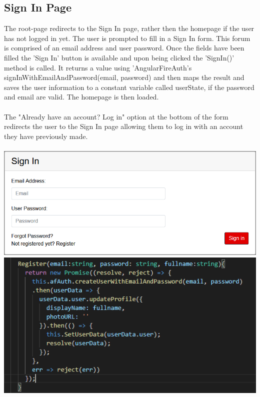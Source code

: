 \subsection{Sign In Page}
The root-page redirects to the Sign In page, rather then the homepage if the user has not logged in yet. The user is prompted to fill  in a Sign In form. This forum is comprised of an email address and user password. Once the fields have been filled the 'Sign In' button is available and upon being clicked the 'SignIn()' method is called. It returns a value using 'AngularFireAuth's signInWithEmailAndPassword(email, password) and then maps the result and saves the user information to a constant variable called userState, if the password and email are valid. The homepage is then loaded. 
\\\\
The "Already have an account? Log in" option at the bottom of the form redirects the user to the Sign In page allowing them to log in with an account they have previously made.
\\\\
\includegraphics[scale=0.3]{./img/SignInPage.png} 
\includegraphics[scale=0.4]{./img/Register.png}\\


